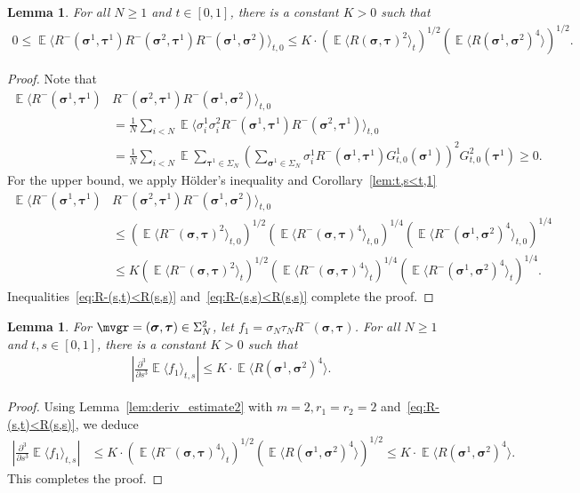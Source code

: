 \documentclass[letterpaper,11pt,reqno]{amsart}
\newtheorem{lem}[thm]{Lemma}
\renewcommand{\le}{\leqslant}
\renewcommand{\leq}{\leqslant}
\renewcommand{\geq}{\geqslant}
\newcommand{\ra}{\rangle}
\newcommand{\la}{\langle}
\newcommand{\abs}[1]{\left\vert#1\right\vert}
\newcommand{\mvgs}{\boldsymbol{\sigma}}\newcommand{\mvgS}{\boldsymbol{\Sigma}}\newcommand{\mvgt}{\boldsymbol{\tau}}
\DeclareMathOperator{\E}{\mathds{E}}
\begin{document}
\begin{lem}\label{lem:2nd_deriv}
    For all \(N \geq 1\) and \(t\in [0,1]\), there is a constant \(K>0\) such that
    \begin{align*}
        0 \le \E\la R^-(\mvgs^1, \mvgt^1) R^-(\mvgs^2, \mvgt^1) R^-(\mvgs^1, \mvgs^2) \ra_{t,0} 
        \le K \cdot (\E \la R(\mvgs, \mvgt)^{2}\ra_{t})^{1/2} (\E \la R(\mvgs^1, \mvgs^2)^4\ra)^{1/2}.
    \end{align*}
\end{lem}
\begin{proof}
    Note that
    \begin{align*}
        \E\la R^-(\mvgs^1, \mvgt^1) 
        &R^-(\mvgs^2, \mvgt^1) R^-(\mvgs^1, \mvgs^2) \ra_{t,0}\\
        &= \frac{1}{N} \sum_{i<N} \E \la \sigma_i^1 \sigma_i^2 R^-(\mvgs^1, \mvgt^1) R^-(\mvgs^2, \mvgt^1) \ra_{t,0} \\
        &= \frac{1}{N} \sum_{i<N} \E  \sum_{\mvgt^1 \in \Sigma_N} \left( \sum_{\mvgs^1 \in \Sigma_N}\sigma_i^1 R^-(\mvgs^1, \mvgt^1) G_{t,0}^1(\mvgs^1) \right)^2 G_{t,0}^2(\mvgt^1)
        \geq 0.
    \end{align*}
    For the upper bound, we apply H\"{o}lder's inequality and Corollary~\ref{lem:t,s<t,1}
    \begin{align*}
        \E\la R^-(\mvgs^1, \mvgt^1)
        &R^-(\mvgs^2, \mvgt^1) R^-(\mvgs^1, \mvgs^2) \ra_{t,0} \\
        & \leq (\E \la R^-(\mvgs, \mvgt)^{2}\ra_{t,0})^{1/2} (\E \la R^-(\mvgs, \mvgt)^{4}\ra_{t,0})^{1/4} (\E \la R^-(\mvgs^1, \mvgs^2)^4\ra_{t,0})^{1/4} \\
        & \leq K (\E \la R^-(\mvgs, \mvgt)^{2}\ra_{t})^{1/2} (\E \la R^-(\mvgs, \mvgt)^{4}\ra_{t})^{1/4} (\E \la R^-(\mvgs^1, \mvgs^2)^4\ra_{t})^{1/4}.
    \end{align*}
    Inequalities~\eqref{eq:R-(s,t)<R(s,s)} and~\eqref{eq:R-(s,s)<R(s,s)} complete the proof.
\end{proof}

\begin{lem}\label{lem:3rd_deriv}
    For \(\mvgr = (\mvgs,\mvgt) \in \Sigma_{N}^2\), let \(f_1 = \sigma_N \tau_N R^- (\mvgs, \mvgt) \).
    For all \(N \geq 1\) and \(t,s \in [0,1]\), there is a constant \(K > 0\) such that
    \begin{align*}
        \abs{\frac{\partial^3}{\partial s^3} \E \la f_1 \ra_{t,s}} 
        \leq K \cdot \E \la R (\mvgs^1, \mvgs^2)^{4} \ra .
    \end{align*} 
\end{lem}
\begin{proof}
    Using Lemma~\ref{lem:deriv_estimate2} with $m=2, r_{1}=r_{2}=2$ and~\eqref{eq:R-(s,t)<R(s,s)}, we deduce
    \begin{align*}
        \abs{\frac{\partial^3}{\partial s^3} \E \la f_1 \ra_{t,s}}
        &\leq K  \cdot\left( \E \la R^- (\mvgs, \mvgt)^{4} \ra_{t} \right)^{1/2} \left( \E \la R (\mvgs^1, \mvgs^2)^{4} \ra \right)^{1/2} 
        \leq K \cdot  \E \la R (\mvgs^1, \mvgs^2)^{4} \ra.
    \end{align*}
    This completes the proof.
\end{proof}
\end{document}
